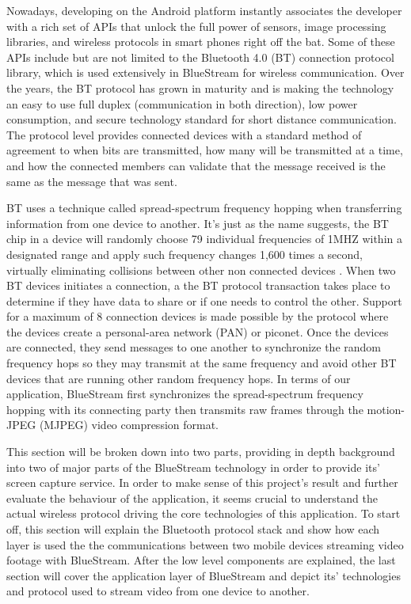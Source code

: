 \documentclass[a4paper,12pt]{article}
\begin{document}
Nowadays, developing on the Android platform instantly associates the developer with a rich set of APIs that unlock the full power of sensors, image processing libraries, and wireless protocols in smart phones right off the bat. Some of these APIs include but are not limited to the Bluetooth 4.0 (BT) connection protocol library, which is used extensively in BlueStream for wireless communication. Over the years, the BT protocol has grown in maturity and is making the technology an easy to use full duplex (communication in both direction), low power consumption, and secure technology standard for short distance communication. The protocol level provides connected devices with a standard method of agreement to when bits are transmitted, how many will be transmitted at a time, and how the connected members can validate that the message received is the same as the message that was sent.

BT uses a technique called spread-spectrum frequency hopping when transferring information from one device to another. It’s just as the name suggests, the BT chip in a device will randomly choose 79 individual frequencies of 1MHZ within a designated range and apply such frequency changes 1,600 times a second, virtually eliminating collisions between other non connected devices \cite{InsideBlueTooth}. When two BT devices initiates a connection, a the BT protocol transaction takes place to determine if they have data to share or if one needs to control the other. Support for a maximum of 8 connection devices is made possible by the protocol where the devices create a personal-area network (PAN) or piconet. Once the devices are connected, they send messages to one another to synchronize the random frequency hops so they may transmit at the same frequency and avoid other BT devices that are running other random frequency hops. In terms of our application, BlueStream first synchronizes the spread-spectrum frequency hopping with its connecting party then transmits raw frames through the motion-JPEG (MJPEG) video compression format. 

This section will be broken down into two parts, providing in depth background into two of major parts of the BlueStream technology in order to provide its’ screen capture service. In order to make sense of this project’s result and further evaluate the behaviour of the application, it seems crucial to understand the actual wireless protocol driving the core technologies of this application. To start off, this section will explain the Bluetooth protocol stack and show how each layer is used the the communications between two mobile devices streaming video footage with BlueStream. After the low level components are explained, the last section will cover the application layer of BlueStream and depict its’ technologies and protocol used to stream video from one device to another.
\end{document}
